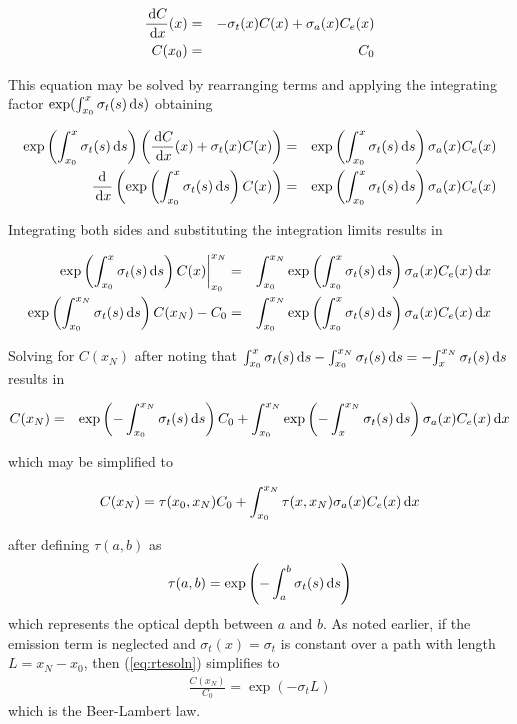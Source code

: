 \begin{eqnarray}
\dLdx&=&-\sigt C(x) + \siga C_e(x)\\
 C(x_0)&=&C_0
\end{eqnarray}

This equation may be solved by rearranging terms and applying the
integrating factor $\exp(\int_{x_0}^x \sigts \dx{s})$ obtaining

\begin{eqnarray}
\intf{x_0}{x}\left(\dLdx+\sigt C(x)\right)&=&  \intf{x_0}{x}\siga \Le\\
\ddx\left(\intf{x_0}{x} C(x)\right)&=& \intf{x_0}{x}\siga \Le
\end{eqnarray}

Integrating both sides and substituting the integration limits
results in

\begin{eqnarray}
\left.\intf{x_0}{x} C(x)\right|_{x_0}^{x_N}&=& \int_{x_0}^{x_N}\intf{x_0}{x}\siga \Le \dx{x} \\
\intf{x_0}{x_N} C(x_N)-C_0&=& \int_{x_0}^{x_N}\intf{x_0}{x}\siga \Le \dx{x}
\end{eqnarray}

Solving for $C(x_N)$ after noting that
$\intff{x_0}{x}-\intff{x_0}{x_N}=-\intff{x}{x_N}$ results in

\begin{eqnarray}
C(x_N)&=&\intmf{x_0}{x_N} C_0+ \int_{x_0}^{x_N}\intmf{x}{x_N}\siga
\Le \dx{x}
\end{eqnarray}

\noindent which may be simplified to

\begin{equation}
\label{eq:rtesoln}
 C(x_N)=\tau(x_0,x_N)C_0 + \int_{x_0}^{x_N}\tau(x,x_N)\siga\Le \dx{x}
\end{equation}

\noindent after defining $\tau(a,b)$ as
\begin{equation}
\label{eq:optdepth}
\tau(a,b)=\intmf{a}{b}
\end{equation}
which represents the optical depth between $a$ and $b$.  As noted earlier, if the emission term is neglected and $\sigma_t(x)=\sigma_t$ is constant over a path with length
$L=x_N-x_0$, then (\ref{eq:rtesoln}) simplifies to
\begin{eqnarray}
 \frac{C(x_N)}{C_0}=\exp(-\sigma_tL)
\end{eqnarray}
which is the Beer-Lambert law.


